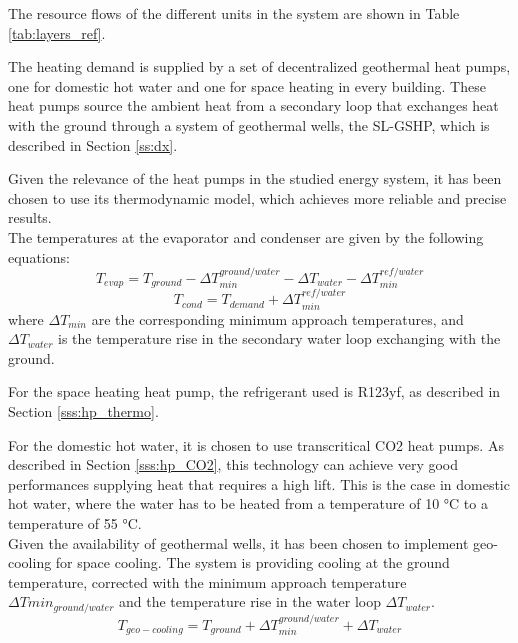 \documentclass{article}
\begin{document}
The resource flows of the different units in the system are shown in Table \ref{tab:layers_ref}.




The heating demand is supplied by a set of decentralized geothermal heat pumps, one for domestic hot water and one for space heating in every building. These heat pumps source the ambient heat from a secondary loop that exchanges heat with the ground through a system of geothermal wells, the SL-GSHP, which is described in Section \ref{ss:dx}. 

Given the relevance of the heat pumps in the studied energy system, it has been chosen to use its thermodynamic model, which achieves more reliable and precise results.\\

The temperatures at the evaporator and condenser are given by the following equations:
\begin{equation}
    T_{evap} = T_{ground} - \Delta T_{min}^{ground/water} - \Delta T_{water} - \Delta T_{min}^{ref/water}
\end{equation}
\begin{equation}
    T_{cond} = T_{demand} + \Delta T_{min}^{ref/water}
\end{equation}
where $\Delta T_{min}$ are the corresponding minimum approach temperatures, and $\Delta T_{water}$ is the temperature rise in the secondary water loop exchanging with the ground.

For the space heating heat pump, the refrigerant used is R123yf, as described in Section \ref{sss:hp_thermo}.

For the domestic hot water, it is chosen to use transcritical CO2 heat pumps. As described in Section \ref{sss:hp_CO2}, this technology can achieve very good performances supplying heat that requires a high lift. This is the case in domestic hot water, where the water has to be heated from a temperature of 10 \si{\celsius} to a temperature of 55 \si{\celsius}.\\

Given the availability of geothermal wells, it has been chosen to implement geo-cooling for space cooling. The system is providing cooling at the ground temperature, corrected with the minimum approach temperature $\Delta Tmin_{ground/water}$ and the temperature rise in the water loop $\Delta T_{water}$.
\begin{equation}
T_{geo-cooling} = T_{ground} + \Delta T_{min}^{ground/water} + \Delta T_{water}
\end{equation}
\end{document}
